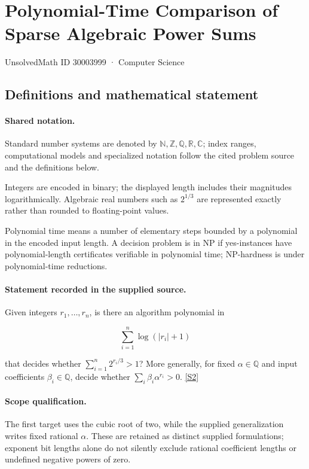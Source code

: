 \documentclass[11pt]{article}
\newcommand{\sref}[2]{\hyperlink{source:#1:#2}{[S#2]}}
\begin{document}
\setcounter{section}{30003998}
\section{Polynomial-Time Comparison of Sparse Algebraic Power Sums}\label{30003999}
{\small\sffamily UnsolvedMath ID 30003999 · Computer Science}
\subsection{Definitions and mathematical statement}

\paragraph{Shared notation.}Standard number systems are denoted by $\mathbb N,\mathbb Z,\mathbb Q,\mathbb R,\mathbb C$; index ranges, computational models and specialized notation follow the cited problem source and the definitions below.


Integers are encoded in binary; the displayed length includes their magnitudes logarithmically. Algebraic real numbers such as $2^{1/3}$ are represented exactly rather than rounded to floating-point values.

Polynomial time means a number of elementary steps bounded by a polynomial in the encoded input length. A decision problem is in $\mathrm{NP}$ if yes-instances have polynomial-length certificates verifiable in polynomial time; NP-hardness is under polynomial-time reductions.
\paragraph{Statement recorded in the supplied source.}
Given integers $r_1,\ldots,r_n$, is there an algorithm polynomial in

$$\sum_{i=1}^n\log(\lvert r_i\rvert+1)$$

that decides whether $\sum_{i=1}^n2^{r_i/3}>1$? More generally, for fixed $\alpha\in\mathbb Q$ and input coefficients $\beta_i\in\mathbb Q$, decide whether $\sum_i\beta_i\alpha^{r_i}>0$. \sref{30003999}{2}
\paragraph{Scope qualification.}
The first target uses the cubic root of two, while the supplied generalization writes fixed rational $\alpha$. These are retained as distinct supplied formulations; exponent bit lengths alone do not silently exclude rational coefficient lengths or undefined negative powers of zero.
\end{document}
